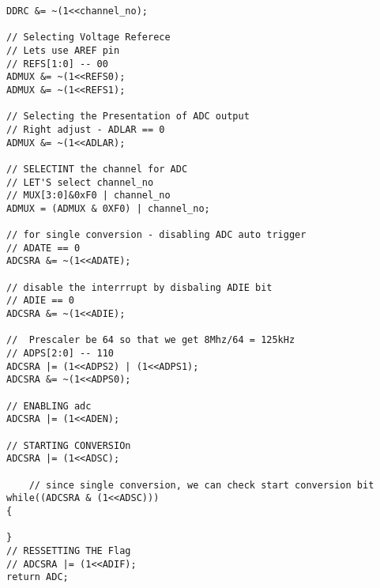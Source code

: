 \documentclass{article}
\begin{document}
\begin{verbatim}
DDRC &= ~(1<<channel_no);

// Selecting Voltage Referece
// Lets use AREF pin
// REFS[1:0] -- 00
ADMUX &= ~(1<<REFS0);
ADMUX &= ~(1<<REFS1);

// Selecting the Presentation of ADC output
// Right adjust - ADLAR == 0
ADMUX &= ~(1<<ADLAR);

// SELECTINT the channel for ADC
// LET'S select channel_no
// MUX[3:0]&0xF0 | channel_no
ADMUX = (ADMUX & 0XF0) | channel_no;

// for single conversion - disabling ADC auto trigger
// ADATE == 0
ADCSRA &= ~(1<<ADATE);

// disable the interrrupt by disbaling ADIE bit
// ADIE == 0
ADCSRA &= ~(1<<ADIE);

//  Prescaler be 64 so that we get 8Mhz/64 = 125kHz
// ADPS[2:0] -- 110
ADCSRA |= (1<<ADPS2) | (1<<ADPS1);
ADCSRA &= ~(1<<ADPS0);

// ENABLING adc
ADCSRA |= (1<<ADEN);

// STARTING CONVERSIOn
ADCSRA |= (1<<ADSC);

    // since single conversion, we can check start conversion bit
while((ADCSRA & (1<<ADSC)))
{
    
}
// RESSETTING THE Flag
// ADCSRA |= (1<<ADIF);
return ADC;
\end{verbatim}
\end{document}
